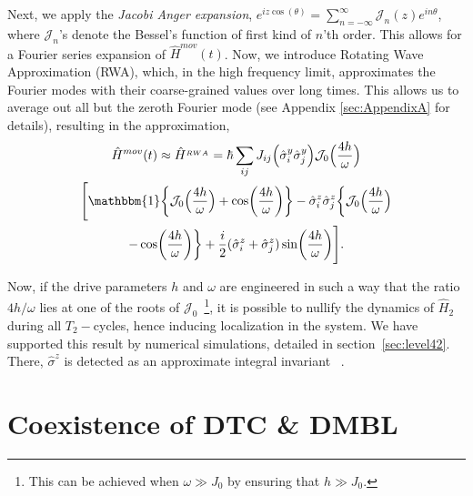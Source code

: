 \documentclass[
nofootinbib,
reprint,
superscriptaddress,
amsmath,amssymb,showkeys,
aps,
prb,
]{revtex4-2}
\begin{document}
	Next, we apply the \textit{Jacobi Anger expansion}, $\displaystyle e^{iz \cos(\theta)} = \sum_{n=-\infty}^{\infty} \mathcal{J}_n(z) e^{in\theta}$, where $\mathcal{J}_n$'s denote the  Bessel's function of first kind of $n$'th order. This allows for a Fourier series expansion of $\hat{H}^{mov}(t)$. Now, we introduce Rotating Wave Approximation (RWA), which, in the high frequency limit, approximates the Fourier modes with their coarse-grained values over long times. This allows us to average out all but the zeroth Fourier mode (see Appendix \ref{sec:AppendixA} for details), resulting in the approximation,
	\begin{multline}
		\hat{H}^{mov}(t)\approx \hat{H}^{_{RWA}} = \hbar\sum_{ij} J_{ij} \Big(\hat{\sigma}^y_i\hat{\sigma}^y_j\Big) \mathcal{J}_0\Big(\frac{4h}{\omega}\Big)\\
		\Bigg[\mathbbm{1}\bigg\{\mathcal{J}_0\Big(\frac{4h}{\omega}\Big) + \cos(\frac{4h}{\omega})\bigg\}-\hat{\sigma}^z_i\hat{\sigma}^z_j \bigg\{\mathcal{J}_0\Big(\frac{4h}{\omega}\Big)\\
		- \cos(\frac{4h}{\omega})\bigg\} + \frac{i}{2} (\hat{\sigma}^z_i + \hat{\sigma}^z_j) \sin(\frac{4h}{\omega})\Bigg].
		\label{eq:movham1}
	\end{multline}
	
	Now, if the drive parameters $h$ and $\omega$  are {engineered} in such a way that the ratio ${4h}/{\omega}$ lies at one of the roots of $\mathcal{J}_0$~\footnote{This can be achieved when $\omega \gg J_0$ by ensuring that $h\gg J_0$.}, it is possible to nullify the dynamics of $\hat{H}_2$ during all $T_2-$cycles, hence inducing localization in the system. We have supported this result by numerical simulations, detailed in section~\ref{sec:level42}. There, $\hat{\sigma}^z$ is detected as an approximate integral invariant ~\cite{Keser2016,Dodonov1978}. 
	
	\section{\label{sec:level3}Coexistence of DTC \& DMBL}
	
\end{document}
